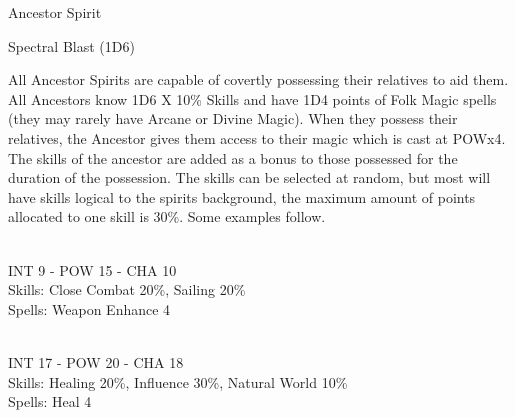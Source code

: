 \begin{samepage}
\begin{monsterbox}{Ancestor Spirit}
\begin{rpg-monsteraction}
		Spectral Blast (1D6)
	\end{rpg-monsteraction}
	\begin{rpg-monsteraction}
		All Ancestor Spirits are capable of covertly possessing their relatives to aid them. All Ancestors know 1D6 X 10\% Skills and have 1D4 points of Folk Magic spells (they may rarely have Arcane or Divine Magic). When they possess their relatives, the Ancestor gives them access to their magic which is cast at POWx4. The skills of the ancestor are added as a bonus to those possessed for the duration of the possession. The skills can be selected at random, but most will have skills logical to the spirits background, the maximum amount of points allocated to one skill is 30\%. Some examples follow.
	\end{rpg-monsteraction}
	\begin{rpg-monsteraction}
		\\INT 9 - POW 15 - CHA 10\\
		Skills: Close Combat 20\%, Sailing 20\%\\
                Spells: Weapon Enhance 4
	\end{rpg-monsteraction}

	\begin{rpg-monsteraction}
		\\INT 17 - POW 20 - CHA 18\\
		Skills: Healing 20\%, Influence 30\%, Natural World 10\%\\
                Spells: Heal 4
	\end{rpg-monsteraction}
\end{monsterbox}
\end{samepage}



